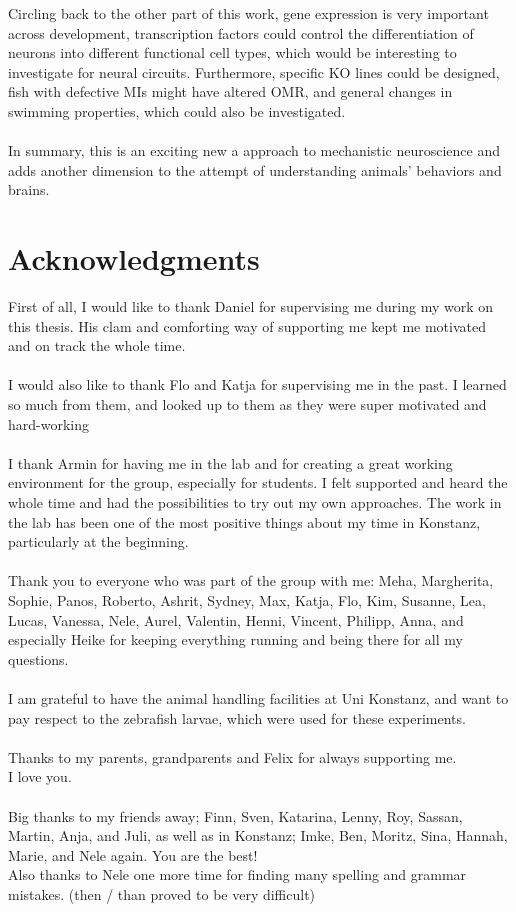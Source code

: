 \documentclass[12pt, a4paper, oneside]{article}
\begin{document}
Circling back to the other part of this work, gene expression is very important across development, transcription factors could control the differentiation of neurons into different functional cell types, which would be interesting to investigate for neural circuits. Furthermore, specific KO lines could be designed, fish with defective MIs might have altered OMR, and general changes in swimming properties, which could also be investigated.\\  
\\
In summary, this is an exciting new a approach to mechanistic neuroscience and adds another dimension to the attempt of understanding animals' behaviors and brains.\\

\clearpage
\section*{Acknowledgments}
First of all, I would like to thank Daniel for supervising me during my work on this thesis. His clam and comforting way of supporting me kept me motivated and on track the whole time.\\
\\
I would also like to thank Flo and Katja for supervising me in the past. I learned so much from them, and looked up to them as they were super motivated and hard-working\\
\\
I thank Armin for having me in the lab and for creating a great working environment for the group, especially for students. I felt supported and heard the whole time and had the possibilities to try out my own approaches. The work in the lab has been one of the most positive things about my time in Konstanz, particularly at the beginning.\\
\\
Thank you to everyone who was part of the group with me: Meha, Margherita, Sophie, Panos, Roberto, Ashrit, Sydney, Max, Katja, Flo, Kim, Susanne, Lea, Lucas, Vanessa, Nele, Aurel, Valentin, Henni, Vincent, Philipp, Anna, and especially Heike for keeping everything running and being there for all my questions.\\
\\
I am grateful to have the animal handling facilities at Uni Konstanz, and want to pay respect to the zebrafish larvae, which were used for these experiments.\\
\\
Thanks to my parents, grandparents and Felix for always supporting me.\\
I love you.\\
\\
Big thanks to my friends away; Finn, Sven, Katarina, Lenny, Roy, Sassan, Martin, Anja, and Juli, as well as in Konstanz; Imke, Ben, Moritz, Sina, Hannah, Marie, and Nele again. You are the best!
\\
{\tiny Also thanks to Nele one more time for finding many spelling and grammar mistakes. (then / than proved to be very difficult)}
\end{document}
